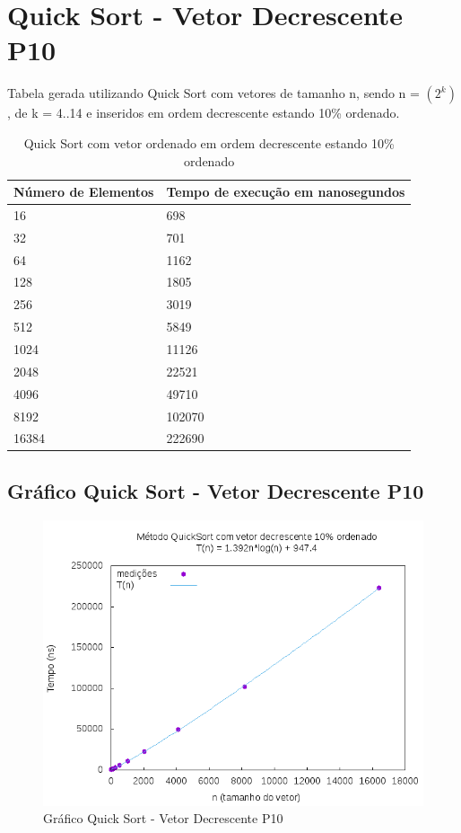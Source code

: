 \documentclass[12pt,a4paper,twoside]{report}
\begin{document}
\section{Quick Sort - Vetor Decrescente P10}
Tabela gerada utilizando Quick Sort com vetores de tamanho n, sendo n = $(2^k)$, de k = 4..14 e inseridos em ordem decrescente estando 10\% ordenado.
\begin{table}[H]
\centering
\caption{Quick Sort com vetor ordenado em ordem decrescente estando 10\% ordenado}
\label{my-label}
\begin{tabular}{|l|l|}
\hline
\multicolumn{1}{|c|}{\textbf{Número de Elementos}} & \multicolumn{1}{c|}{\textbf{Tempo de execução em nanosegundos}} \\ \hline
16 & 698 \\ \hline
32 & 701 \\ \hline
64 & 1162 \\ \hline
128 & 1805 \\ \hline
256 & 3019 \\ \hline
512 & 5849 \\ \hline
1024 & 11126 \\ \hline
2048 & 22521 \\ \hline
4096 & 49710 \\ \hline
8192 & 102070 \\ \hline
16384 & 222690 \\ \hline
\end{tabular}
\end{table}

\subsection{Gráfico Quick Sort - Vetor Decrescente P10}
\begin{figure}[H]
    \centering
    \includegraphics[width=0.7\linewidth]{graficos/QuickSort/vIntDecrescenteP10/vIntDecrescenteP10.png}
  \caption{Gráfico Quick Sort - Vetor Decrescente P10}
\end{figure}
\end{document}
